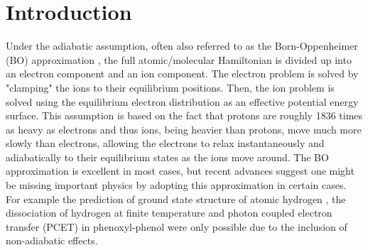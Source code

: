 \documentclass[aps,prl,superscriptaddress,groupedaddress]{revtex4}
\begin{document}


\maketitle

\section{Introduction}
Under the adiabatic assumption, often also referred to as the Born-Oppenheimer (BO) approximation \cite{BO}, the full atomic/molecular Hamiltonian is divided up into an electron component and an ion component. The electron problem is solved by "clamping" the ions to their equilibrium positions. Then, the ion problem is solved using the equilibrium electron distribution as an effective potential energy surface. This assumption is based on the fact that protons are roughly 1836 times as heavy as electrons and thus ions, being heavier than protons, move much more slowly than electrons, allowing the electrons to relax instantaneously and adiabatically to their equilibrium states as the ions move around. The BO approximation is excellent in most cases, but recent advances suggest one might be missing important physics by adopting this approximation in certain cases. For example the prediction of ground state structure of atomic hydrogen \cite{Ceperley_1987,Natoli_1993,Natoli_1995}, the dissociation of hydrogen at finite temperature \cite{Mazzola_FiniteT} and photon coupled electron transfer (PCET) in phenoxyl-phenol \cite{Sirjoosingh_PCET} were only possible due to the inclusion of non-adiabatic effects.
\end{document}
